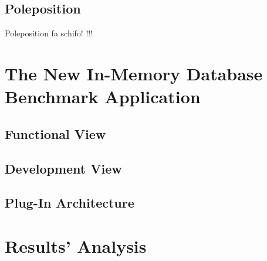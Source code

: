 	\section{Poleposition}
	Poleposition fa schifo! \cite{poleposition}!!!
	
	
\chapter{The New In-Memory Database Benchmark Application}
	\section{Functional View}
	\section{Development View}
	\section{Plug-In Architecture}

\chapter{Results' Analysis}
